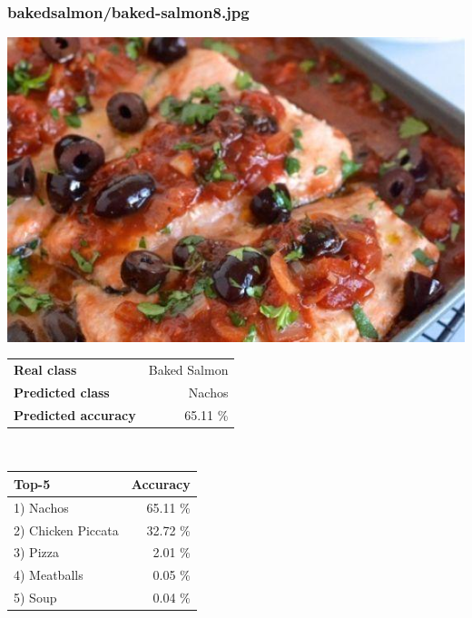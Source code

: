 \subsubsection{baked\textunderscore salmon/baked-salmon8.jpg}

\begin{minipage}[t]{0.4\textwidth}
	\vspace{0pt}
	\includegraphics[width=\linewidth]{images/evaluation-images/baked_salmon/baked-salmon8.jpg}
\end{minipage}
\hfill
\begin{minipage}[t]{0.5\textwidth}
	\vspace{0pt}\raggedright
	\begin{tabularx}{\textwidth}{X r}
		\small \textbf{Real class} & \small Baked Salmon\\
		\small \textbf{Predicted class} & \small Nachos\\
		\small \textbf{Predicted accuracy} & \small 65.11 \%
    \end{tabularx}\\
    
    \vspace{6pt}
	\begin{tabularx}{\textwidth}{X r}
        \small \textbf{Top-5} & \small \textbf{Accuracy} \\
        \hline
		\small 1) Nachos & \small 65.11 \%\\\small 2) Chicken Piccata & \small 32.72 \%\\\small 3) Pizza & \small 2.01 \%\\\small 4) Meatballs & \small 0.05 \%\\\small 5) Soup & \small 0.04 \%
    \end{tabularx}
\end{minipage}
    
